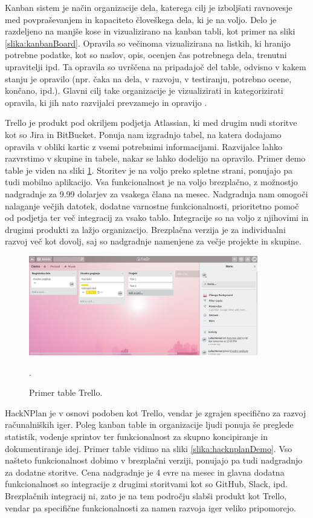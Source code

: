 \documentclass[12pt,a4paper,twoside]{book}
\begin{document}
Kanban sistem je način organizacije dela, katerega cilj je izboljšati ravnovesje med povpraševanjem in kapaciteto človeškega dela, ki je na voljo. Delo je razdeljeno na manjše kose in vizualizirano na kanban tabli, kot primer na sliki \ref{slika:kanbanBoard}. Opravila so večinoma vizualizirana na listkih, ki hranijo potrebne podatke, kot so naslov, opis, ocenjen čas potrebnega dela, trenutni upravitelji ipd. Ta opravila so uvrščena na pripadajoč del table, odvisno v kakem stanju je opravilo (npr. čaka na dela, v razvoju, v testiranju, potrebno ocene, končano, ipd.). Glavni cilj take organizacije je vizualizirati in kategorizirati opravila, ki jih nato razvijalci prevzamejo in opravijo \cite{kanbanBoard}.

Trello je produkt pod okriljem podjetja Atlassian, ki med drugim nudi storitve kot so Jira in BitBucket. Ponuja nam izgradnjo tabel, na katera dodajamo opravila v obliki kartic z vsemi potrebnimi informacijami. Razvijalce lahko razvrstimo v skupine in tabele, nakar se lahko dodelijo na opravilo. Primer demo table je viden na sliki \ref{slika:trelloDemo}. Storitev je na voljo preko spletne strani, ponujajo pa tudi mobilno aplikacijo. Vsa funkcionalnost je na voljo brezplačno, z možnostjo nadgradnje za 9.99 dolarjev za vsakega člana na mesec. Nadgradnja nam omogoči nalaganje večjih datotek, dodatne varnostne funkcionalnosti, prioritetno pomoč od podjetja ter več integracij za vsako tablo. Integracije so na voljo z njihovimi in drugimi produkti za lažjo organizacijo. Brezplačna verzija je za individualni razvoj več kot dovolj, saj so nadgradnje namenjene za večje projekte in skupine.

\begin{figure}[h]
	\centering
	\includegraphics[width=10cm]{trelloBoardDemo}
	\caption{Primer table Trello.}.
	\label{slika:trelloDemo}
	\vspace*{-2em}
\end{figure}

HackNPlan je v osnovi podoben kot Trello, vendar je zgrajen specifično za razvoj računalniških iger. Poleg kanban table in organizacije ljudi ponuja še preglede statistik, vodenje sprintov ter funkcionalnost za skupno koncipiranje in dokumentiranje idej. Primer table vidimo na sliki \ref{slika:hacknplanDemo}. Vso našteto funkcionalnost dobimo v brezplačni verziji, ponujajo pa tudi nadgradnjo za dodatne storitve. Cena nadgradnje je 4 evre na mesec in glavna dodatna funkcionalnost so integracije z drugimi storitvami kot so GitHub, Slack, ipd. Brezplačnih integracij ni, zato je na tem področju slabši produkt kot Trello, vendar pa specifične funkcionalnosti za namen razvoja iger veliko pripomorejo.
\end{document}
